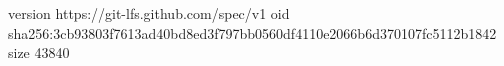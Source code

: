 version https://git-lfs.github.com/spec/v1
oid sha256:3cb93803f7613ad40bd8ed3f797bb0560df4110e2066b6d370107fc5112b1842
size 43840
